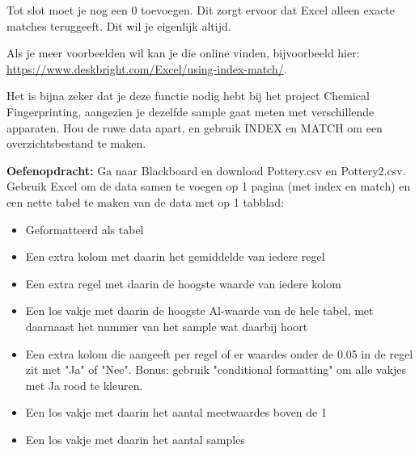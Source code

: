 Tot slot moet je nog een 0 toevoegen. Dit zorgt ervoor dat Excel alleen exacte matches teruggeeft. Dit wil je eigenlijk altijd. 

Als je meer voorbeelden wil kan je die online vinden, bijvoorbeeld hier:\\
\href{https://www.deskbright.com/Excel/using-index-match/}{\textsf{https://www.deskbright.com/Excel/using-index-match/}}. 

Het is bijna zeker dat je deze functie nodig hebt bij het project Chemical Fingerprinting, aangezien je dezelfde sample gaat meten met verschillende apparaten. Hou de ruwe data apart, en gebruik INDEX en MATCH om een overzichtsbestand te maken.

\color{saxion}\textbf{Oefenopdracht: }\color{black} Ga naar Blackboard en download Pottery.csv en Pottery2.csv. Gebruik Excel om de data samen te voegen op 1 pagina (met index en match) en een nette tabel te maken van de data met op 1 tabblad:
\begin{itemize}
    \item Geformatteerd als tabel
    \item Een extra kolom met daarin het gemiddelde van iedere regel
    \item Een extra regel met daarin de hoogste waarde van iedere kolom
    \item Een los vakje met daarin de hoogste Al-waarde van de hele tabel, met daarnaast het nummer van het sample wat daarbij hoort
    \item Een extra kolom die aangeeft per regel of er waardes onder de 0.05 in de regel zit met "Ja" of "Nee". Bonus: gebruik "conditional formatting" om alle vakjes met Ja rood te kleuren.
    \item Een los vakje met daarin het aantal meetwaardes boven de 1
    \item Een los vakje met daarin het aantal samples
\end{itemize}


